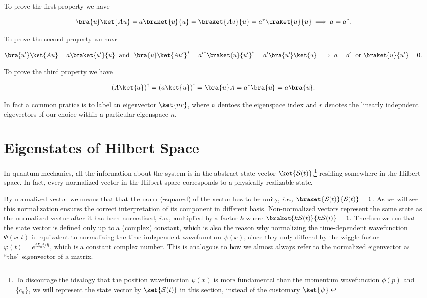 \documentclass[a4paper,12pt]{report}
\begin{document}
To prove the first property we have 

\begin{equation}
  \bra{u} \ket{Au} = a \braket{u}{u} = \braket{Au}{u} = a^*\braket{u}{u} \implies a = a^*.
\end{equation}

To prove the second property we have 

\begin{equation}
\bra{u'}\ket{Au} = a \braket{u'}{u} ~\text { and }~ \bra{u}\ket{Au'} ^* = {a'}^* \braket{u}{u'}^* = a' \bra{u'}\ket{u} \implies a = a' ~\text{ or } \braket{u}{u'} = 0.     
\end{equation}

To prove the third property we have

\begin{equation}
  (A\ket{u}){}^{\dagger}  = (a\ket{u})^{\dagger} = \bra{u} A = a^*\bra{u} = a\bra{u}. 
\end{equation}

In fact a common pratice is to label an eigenvector \(\ket{nr} \), where \(n\) dentoes the eigenspace index and \(r\) denotes the linearly indepndent eigevectors of our choice within a particular eigenspace \(n\). 

\section{Eigenstates of Hilbert Space}

In quantum mechanics, all the information about the system is in the abstract state vector \(\ket{\mathcal{S}(t)} \),\footnote{To discourage the idealogy that the position wavefunction \(\psi (x)\) is more fundamental than the momentum wavefunction \(\phi (p)\) and \(\{c_{n}\} \), we will represent the state vector by \(\ket{\mathcal{S}(t)} \) in this section, instead of the customary \(\ket{\psi } \).} residing somewhere in the Hilbert space. In fact, every normalized vector in the Hilbert space corresponds to a physically realizable state. 

By normalized vector we means that that the norm (-squared) of the vector has to be unity, \textit{i.e.,} \(\braket{\mathcal{S}(t)}{\mathcal{S}(t)} = 1 \). As we will see this normalization ensures the correct interpretation of its component in different basis. Non-normalized vectors represent the same state as the normalized vector after it has been normalized, \textit{i.e.,} multiplied by a factor \(k\) where \(\braket{k \mathcal{S}(t)}{k \mathcal{S}(t)} =1\). Therfore we see that the state vector is defined only up to a (complex) constant, which is also the reason why normalizing the time-dependent wavefunction \(\Psi (x,t)\) is equivalent to normalizing the time-independent wavefunction \(\psi (x)\), since they only differed by the wiggle factor \(\varphi (t) = e^{iE_{n}t/\hbar  } \), which is a constant complex number. This is analogous to how we almost always refer to the normalized eigenvector as ``the'' eigenvector of a matrix.
\end{document}
